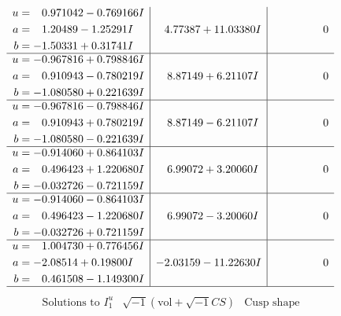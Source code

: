 \documentclass[1p]{elsarticle_modified}
\theoremstyle{definition}
\newcommand{\I}{\sqrt{-1}}
\begin{document}
$$\begin{array}{c|c|c}
\begin{aligned}
u &= \phantom{-}0.971042 - 0.769166 I \\
a &= \phantom{-}1.20489 - 1.25291 I \\
b &= -1.50331 + 0.31741 I\end{aligned}
 & \phantom{-}4.77387 + 11.03380 I & \phantom{-0.000000 } 0 \\ \hline\begin{aligned}
u &= -0.967816 + 0.798846 I \\
a &= \phantom{-}0.910943 - 0.780219 I \\
b &= -1.080580 + 0.221639 I\end{aligned}
 & \phantom{-}8.87149 + 6.21107 I & \phantom{-0.000000 } 0 \\ \hline\begin{aligned}
u &= -0.967816 - 0.798846 I \\
a &= \phantom{-}0.910943 + 0.780219 I \\
b &= -1.080580 - 0.221639 I\end{aligned}
 & \phantom{-}8.87149 - 6.21107 I & \phantom{-0.000000 } 0 \\ \hline\begin{aligned}
u &= -0.914060 + 0.864103 I \\
a &= \phantom{-}0.496423 + 1.220680 I \\
b &= -0.032726 - 0.721159 I\end{aligned}
 & \phantom{-}6.99072 + 3.20060 I & \phantom{-0.000000 } 0 \\ \hline\begin{aligned}
u &= -0.914060 - 0.864103 I \\
a &= \phantom{-}0.496423 - 1.220680 I \\
b &= -0.032726 + 0.721159 I\end{aligned}
 & \phantom{-}6.99072 - 3.20060 I & \phantom{-0.000000 } 0 \\ \hline\begin{aligned}
u &= \phantom{-}1.004730 + 0.776456 I \\
a &= -2.08514 + 0.19800 I \\
b &= \phantom{-}0.461508 - 1.149300 I\end{aligned}
 & -2.03159 - 11.22630 I & \phantom{-0.000000 } 0\\
 \hline 
 \end{array}$$\newpage$$\begin{array}{c|c|c}  
\text{Solutions to }I^u_{1}& \I (\text{vol} + \sqrt{-1}CS) & \text{Cusp shape}\\
 \hline 
\begin{aligned}

\end{aligned}
\end{array}$$
\end{document}
